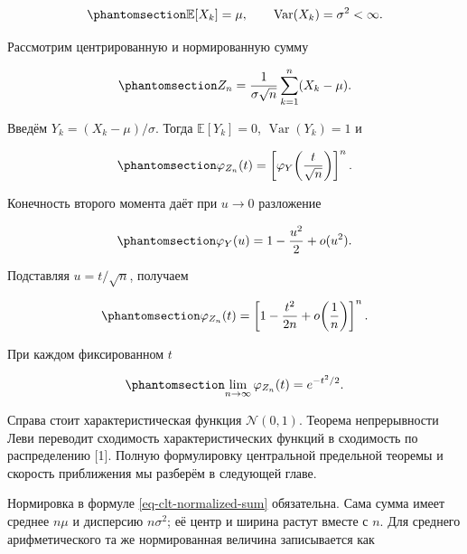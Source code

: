 \documentclass[
  russian,
  11pt,
  a4paper,
  open=any]{scrbook}
\begin{document}
\begin{equation}\protect\phantomsection\label{eq-clt-iid-moments}{
\mathbb E[X_k]=\mu,
\qquad
\operatorname{Var}(X_k)=\sigma^2<\infty.
}\end{equation}

Рассмотрим центрированную и нормированную сумму

\begin{equation}\protect\phantomsection\label{eq-clt-normalized-sum}{
Z_n=
\frac{1}{\sigma\sqrt n}
\sum_{k=1}^{n}(X_k-\mu).
}\end{equation}

Введём \(Y_k=(X_k-\mu)/\sigma\). Тогда \(\mathbb E[Y_k]=0\),
\(\operatorname{Var}(Y_k)=1\) и

\begin{equation}\protect\phantomsection\label{eq-clt-characteristic-sum}{
\varphi_{Z_n}(t)=
\left[
\varphi_Y\!\left(\frac{t}{\sqrt n}\right)
\right]^n.
}\end{equation}

Конечность второго момента даёт при \(u\to0\) разложение

\begin{equation}\protect\phantomsection\label{eq-clt-small-argument-expansion}{
\varphi_Y(u)=1-\frac{u^2}{2}+o(u^2).
}\end{equation}

Подставляя \(u=t/\sqrt n\), получаем

\begin{equation}\protect\phantomsection\label{eq-clt-characteristic-before-limit}{
\varphi_{Z_n}(t)=
\left[
1-\frac{t^2}{2n}+o\!\left(\frac1n\right)
\right]^n.
}\end{equation}

При каждом фиксированном \(t\)

\begin{equation}\protect\phantomsection\label{eq-clt-characteristic-limit}{
\lim_{n\to\infty}\varphi_{Z_n}(t)=e^{-t^2/2}.
}\end{equation}

Справа стоит характеристическая функция \(\mathcal N(0,1)\). Теорема
непрерывности Леви переводит сходимость характеристических функций в
сходимость по распределению {[}1{]}. Полную формулировку центральной
предельной теоремы и скорость приближения мы разберём в следующей главе.

Нормировка в формуле \ref{eq-clt-normalized-sum} обязательна. Сама сумма
имеет среднее \(n\mu\) и дисперсию \(n\sigma^2\); её центр и ширина
растут вместе с \(n\). Для среднего арифметического та же нормированная
величина записывается как
\end{document}
